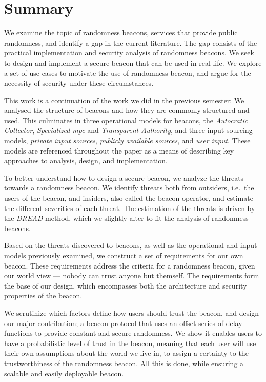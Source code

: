 \section*{Summary}
We examine the topic of randomness beacons, services that provide public randomness, and identify a gap in the current literature.
The gap consists of the practical implementation and security analysis of randomness beacons.
We seek to design and implement a secure beacon that can be used in real life.
We explore a set of use cases to motivate the use of randomness beacon, and argue for the necessity of security under these circumstances.

This work is a continuation of the work we did in the previous semester: We analysed the structure of beacons and how they are commonly structured and used.
This culminates in three operational models for beacons, the \emph{Autocratic Collector}, \emph{Specialized \acrshort{mpc}} and \emph{Transparent Authority}, and three input sourcing models, \emph{private input sources}, \emph{publicly available sources}, and \emph{user input}.
These models are referenced throughout the paper as a means of describing key approaches to analysis, design, and implementation.

\bigskip\noindent
To better understand how to design a secure beacon, we analyze the threats towards a randomness beacon.
We identify threats both from outsiders, i.e.\ the users of the beacon, and insiders, also called the beacon operator, and estimate the different severities of each threat.
The estimation of the threats is driven by the \emph{DREAD} method, which we slightly alter to fit the analysis of randomness beacons.

Based on the threats discovered to beacons, as well as the operational and input models previously examined, we construct a set of requirements for our own beacon.
These requirements address the criteria for a randomness beacon, given our world view --- nobody can trust anyone but themself.
The requirements form the base of our design, which encompasses both the architecture and security properties of the beacon.

\bigskip\noindent
We scrutinize which factors define how users should trust the beacon, and design our major contribution; a beacon protocol that uses an offset series of delay functions to provide constant and secure randomness.
We show it enables users to have a probabilistic level of trust in the beacon, meaning that each user will use their own assumptions about the world we live in, to assign a certainty to the trustworthiness of the randomness beacon.
All this is done, while ensuring a scalable and easily deployable beacon.

